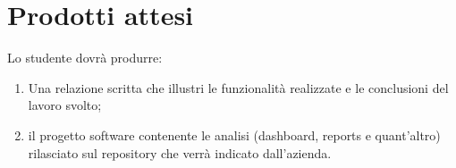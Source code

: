 \section*{Prodotti attesi}
Lo studente dovrà produrre:
\begin{enumerate}
    \item
     Una relazione scritta che illustri le funzionalità realizzate e le conclusioni del lavoro svolto;
    
    \item il progetto software contenente le analisi (dashboard, reports e quant'altro) rilasciato sul repository che verrà indicato dall'azienda.
    
\end{enumerate}

